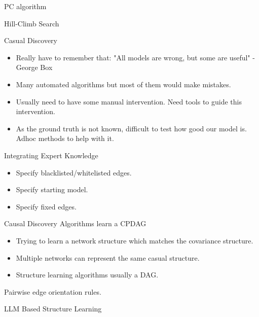 \documentclass{beamer}
\begin{document}
\begin{frame}{PC algorithm}
\end{frame}

\begin{frame}{Hill-Climb Search}
\end{frame}

\begin{frame}{Casual Discovery}
	\begin{itemize}
		\item Really have to remember that: "All models are wrong, but some are useful" - George Box
		\item Many automated algorithms but most of them would make mistakes.
		\item Usually need to have some manual intervention. Need tools to guide this intervention.
		\item As the ground truth is not known, difficult to test how good our model is. Adhoc methods to help with it.
	\end{itemize}
\end{frame}

\begin{frame}{Integrating Expert Knowledge}
	\begin{itemize}
		\item Specify blacklisted/whitelisted edges.
		\item Specify starting model.
		\item Specify fixed edges.
	\end{itemize}
\end{frame}

\begin{frame}{Causal Discovery Algorithms learn a CPDAG}
	\begin{itemize}
		\item Trying to learn a network structure which matches the covariance
			structure.
		\item Multiple networks can represent the same casual structure.
		\item Structure learning algorithms usually a DAG.
	\end{itemize}

	Pairwise edge orientation rules.
\end{frame}

\begin{frame}
\end{frame}

\begin{frame}{LLM Based Structure Learning}
\end{frame}
\end{document}
